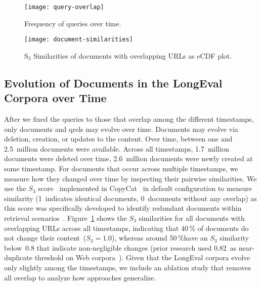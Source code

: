 

\begin{figure}[t]
    \begin{minipage}{.49\textwidth}
        \texttt{[image: query-overlap]}
        \vspace{-4ex}
        \caption{Frequency of queries over time.}
        \label{fig:query-overlap}
    \end{minipage}
    \hfill    
    \begin{minipage}{.49\textwidth}
        \texttt{[image: document-similarities]}
        \vspace{-4ex}
        \caption{S$_{3}$ Similarities of documents with overlapping URLs as eCDF plot.}
        \label{fig:document-similarities}
    \end{minipage}
\end{figure}

\subsection{Evolution of Documents in the LongEval Corpora over Time}

After we fixed the queries to those that overlap among the different timestamps, only documents and qrels may evolve over time. Documents may evolve via deletion, creation, or updates to the content. Over time, between one and 2.5~million documents were available. Across all timestamps, 1.7~million documents were deleted over time, 2.6~million documents were newly created at some timestamp. For documents that occur across multiple timestamps, we measure how they changed over time by inspecting their pairwise similarities. We use the $S_{3}$ score~\cite{bernstein:2005} implemented in CopyCat~\cite{froebe:2021a} in default configuration to measure similarity (1~indicates identical documents, 0~documents without any overlap) as this score was specifically developed to identify redundant documents within retrieval scenarios~\cite{bernstein:2005}. Figure~\ref{fig:document-similarities} shows the $S_{3}$ similarities for all documents with overlapping URLs across all timestamps, indicating that 40\,\% of documents do not change their content~($S_{3}=1.0$), whereas around 50\,\%have an $S_{3}$ similarity below~0.8 that indicate non-negligible changes (prior research used 0.82~as near-duplicate threshold on Web corpora~\cite{froebe:2021a}). Given that the LongEval corpora evolve only slightly among the timestamps, we include an ablation study that removes all overlap to analyze how approaches generalize.



